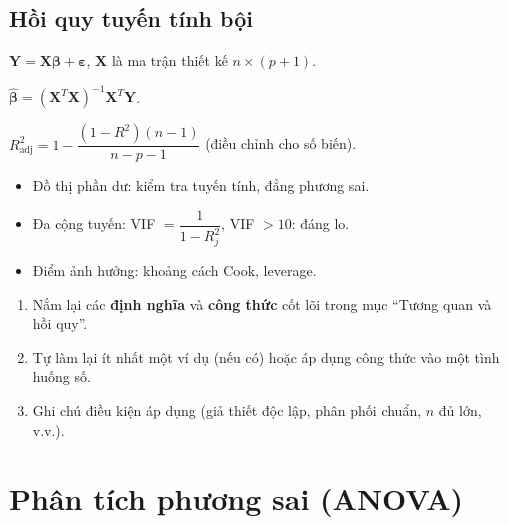 \documentclass[12pt,a4paper]{article}
\begin{document}
\subsection{Hồi quy tuyến tính bội}

\begin{dinhnghia}
  $\mathbf{Y} = \mathbf{X}\boldsymbol{\beta} + \boldsymbol{\varepsilon}$, $\mathbf{X}$ là ma trận thiết kế $n \times (p+1)$.
\end{dinhnghia}

\begin{congthuc}[title={OLS bội}]
  $\hat{\boldsymbol{\beta}} = (\mathbf{X}^T\mathbf{X})^{-1}\mathbf{X}^T\mathbf{Y}$.

  $R^2_{\text{adj}} = 1 - \dfrac{(1-R^2)(n-1)}{n-p-1}$ (điều chỉnh cho số biến).
\end{congthuc}

\begin{phuongphap}[title={Chẩn đoán mô hình}]
  \begin{itemize}
    \item Đồ thị phần dư: kiểm tra tuyến tính, đẳng phương sai.
    \item Đa cộng tuyến: VIF $= \dfrac{1}{1 - R_j^2}$, VIF $> 10$: đáng lo.
    \item Điểm ảnh hưởng: khoảng cách Cook, leverage.
  \end{itemize}
\end{phuongphap}


\begin{tongket}[title={Tổng kết: Tương quan và hồi quy}]
\begin{enumerate}
  \item Nắm lại các \textbf{định nghĩa} và \textbf{công thức} cốt lõi trong mục ``Tương quan và hồi quy''.
  \item Tự làm lại ít nhất một ví dụ (nếu có) hoặc áp dụng công thức vào một tình huống số.
  \item Ghi chú điều kiện áp dụng (giả thiết độc lập, phân phối chuẩn, $n$ đủ lớn, v.v.).
\end{enumerate}
\end{tongket}

\section{Phân tích phương sai (ANOVA)}
\end{document}
